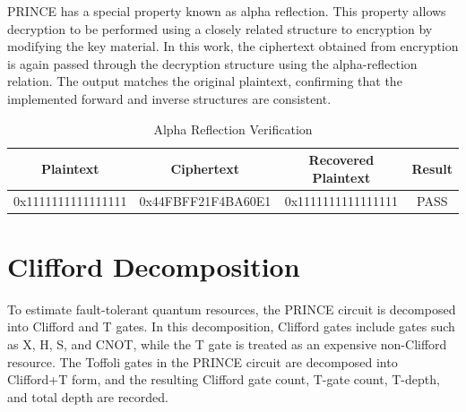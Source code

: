 \documentclass[12pt,a4paper]{report}
\begin{document}
\begin{table}[h]
\centering
\caption{Classical and Quantum PRINCE Ciphertext Comparison}
\label{tab:classical_quantum_match}
\end{table}

PRINCE has a special property known as alpha reflection. This property allows decryption to be performed using a closely related structure to encryption by modifying the key material. In this work, the ciphertext obtained from encryption is again passed through the decryption structure using the alpha-reflection relation. The output matches the original plaintext, confirming that the implemented forward and inverse structures are consistent.

\begin{table}[h]
\centering
\caption{Alpha Reflection Verification}
\label{tab:alpha_reflection}
\begin{tabular}{|c|c|c|c|}
\hline
\textbf{Plaintext} & \textbf{Ciphertext} & \textbf{Recovered Plaintext} & \textbf{Result} \\
\hline
0x1111111111111111 & 0x44FBFF21F4BA60E1 & 0x1111111111111111 & PASS \\
\hline
\end{tabular}
\end{table}

\section{Clifford Decomposition}

To estimate fault-tolerant quantum resources, the PRINCE circuit is decomposed into Clifford and T gates. In this decomposition, Clifford gates include gates such as X, H, S, and CNOT, while the T gate is treated as an expensive non-Clifford resource. The Toffoli gates in the PRINCE circuit are decomposed into Clifford+T form, and the resulting Clifford gate count, T-gate count, T-depth, and total depth are recorded.
\end{document}
